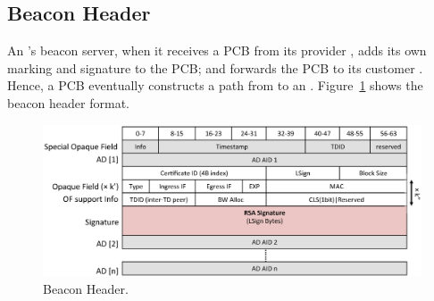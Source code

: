\subsection{Beacon Header}
An \AD's beacon server, when it receives a PCB from its provider \AD, adds its own marking and signature to the PCB; and forwards the PCB to its customer \AD. Hence, a PCB eventually constructs a path from \ISDC to an \STUB \AD. Figure~\ref{fig:hdr-beacon} shows the beacon header format.

\begin{figure}[ht]
\centering
\includegraphics[width=.9\columnwidth]{./fig/nhdr_pcb.eps}
\caption{Beacon Header.}\label{fig:hdr-beacon}
\end{figure}

